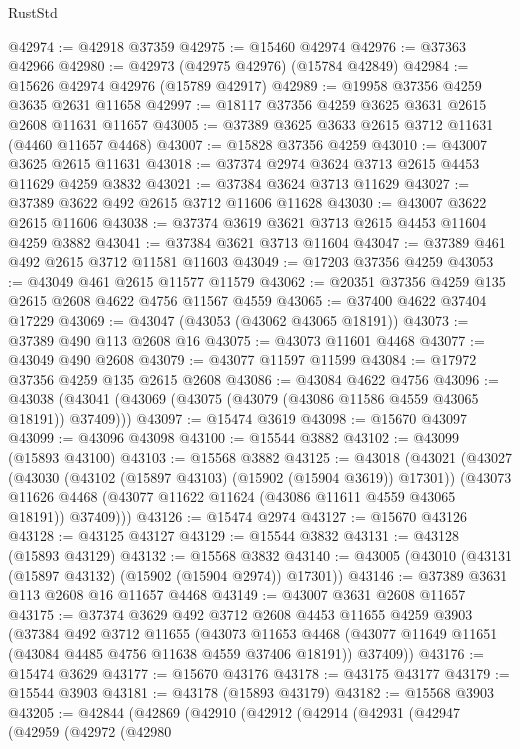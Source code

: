 \begin{lexlean}{RustStd}
\begin{coremodule}
@42974 := @42918 @37359
@42975 := @15460 @42974
@42976 := @37363 @42966
@42980 := @42973 (@42975 @42976) (@15784 @42849)
@42984 := @15626 @42974 @42976 (@15789 @42917)
@42989 := @19958 @37356 @4259 @3635 @2631 @11658
@42997 := @18117 @37356 @4259 @3625 @3631 @2615 @2608 @11631 @11657
@43005 := @37389 @3625 @3633 @2615 @3712 @11631 (@4460 @11657 @4468)
@43007 := @15828 @37356 @4259
@43010 := @43007 @3625 @2615 @11631
@43018 := @37374 @2974 @3624 @3713 @2615 @4453 @11629 @4259 @3832
@43021 := @37384 @3624 @3713 @11629
@43027 := @37389 @3622 @492 @2615 @3712 @11606 @11628
@43030 := @43007 @3622 @2615 @11606
@43038 := @37374 @3619 @3621 @3713 @2615 @4453 @11604 @4259 @3882
@43041 := @37384 @3621 @3713 @11604
@43047 := @37389 @461 @492 @2615 @3712 @11581 @11603
@43049 := @17203 @37356 @4259
@43053 := @43049 @461 @2615 @11577 @11579
@43062 := @20351 @37356 @4259 @135 @2615 @2608 @4622 @4756 @11567 @4559
@43065 := @37400 @4622 @37404 @17229
@43069 := @43047 (@43053 (@43062 @43065 @18191))
@43073 := @37389 @490 @113 @2608 @16
@43075 := @43073 @11601 @4468
@43077 := @43049 @490 @2608
@43079 := @43077 @11597 @11599
@43084 := @17972 @37356 @4259 @135 @2615 @2608
@43086 := @43084 @4622 @4756
@43096 := @43038 (@43041 (@43069 (@43075 (@43079 (@43086 @11586 @4559 @43065 @18191)) @37409)))
@43097 := @15474 @3619
@43098 := @15670 @43097
@43099 := @43096 @43098
@43100 := @15544 @3882
@43102 := @43099 (@15893 @43100)
@43103 := @15568 @3882
@43125 := @43018
    (@43021
      (@43027
        (@43030 (@43102 (@15897 @43103) (@15902 (@15904 @3619)) @17301))
        (@43073 @11626 @4468 (@43077 @11622 @11624 (@43086 @11611 @4559 @43065 @18191)) @37409)))
@43126 := @15474 @2974
@43127 := @15670 @43126
@43128 := @43125 @43127
@43129 := @15544 @3832
@43131 := @43128 (@15893 @43129)
@43132 := @15568 @3832
@43140 := @43005 (@43010 (@43131 (@15897 @43132) (@15902 (@15904 @2974)) @17301))
@43146 := @37389 @3631 @113 @2608 @16 @11657 @4468
@43149 := @43007 @3631 @2608 @11657
@43175 := @37374
    @3629
    @492
    @3712
    @2608
    @4453
    @11655
    @4259
    @3903
    (@37384
      @492
      @3712
      @11655
      (@43073
        @11653
        @4468
        (@43077 @11649 @11651 (@43084 @4485 @4756 @11638 @4559 @37406 @18191))
        @37409))
@43176 := @15474 @3629
@43177 := @15670 @43176
@43178 := @43175 @43177
@43179 := @15544 @3903
@43181 := @43178 (@15893 @43179)
@43182 := @15568 @3903
@43205 := @42844
    (@42869
      (@42910
        (@42912
          (@42914
            (@42931
              (@42947
                (@42959
                  (@42972
                    (@42980

\end{coremodule}
\end{lexlean}
